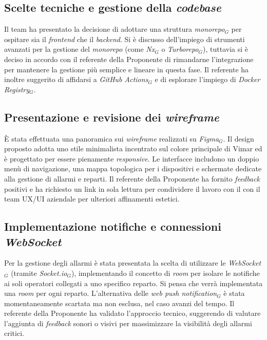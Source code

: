 \documentclass[10pt, letterpaper]{article}
\begin{document}
\subsection*{Scelte tecniche e gestione della \textit{codebase}}
Il team ha presentato la decisione di adottare una struttura \textit{monorepo$_G$} per ospitare sia il
\textit{frontend} che il \textit{backend}. Si è discusso dell'impiego di strumenti avanzati per la gestione
del \textit{monorepo} (come \textit{Nx$_G$} o \textit{Turborepo$_G$}), tuttavia si è deciso in accordo con il
referente della Proponente di rimandarne l'integrazione per mantenere la gestione più semplice e lineare in questa fase.
Il referente ha inoltre suggerito di affidarsi a \textit{GitHub Actions$_G$} e di esplorare l'impiego di \textit{Docker Registry$_G$}.

\subsection*{Presentazione e revisione dei \textit{wireframe}}
È stata effettuata una panoramica sui \textit{wireframe} realizzati su \textit{Figma$_G$}. Il design
proposto adotta uno stile minimalista incentrato sul colore principale di Vimar ed è progettato per essere pienamente
\textit{responsive}. Le interfacce includono un doppio menù di navigazione, una mappa topologica per i dispositivi
e schermate dedicate alla gestione di allarmi e reparti. Il referente della Proponente ha fornito \textit{feedback}
positivi e ha richiesto un link in sola lettura per condividere il lavoro con il con il team UX/UI aziendale
per ulteriori affinamenti estetici.

\subsection*{Implementazione notifiche e connessioni \textit{WebSocket}}
Per la gestione degli allarmi è stata presentata la scelta di utilizzare le \textit{WebSocket$_G$}
(tramite \textit{Socket.io$_G$}), implementando il concetto di \textit{room} per isolare le notifiche ai soli operatori
collegati a uno specifico reparto. Si pensa che verrà implementata una \textit{room} per ogni reparto.
L'alternativa delle \textit{web push notification$_G$} è stata momentaneamente scartata ma non esclusa, nel caso avanzi del tempo.
Il referente della Proponente ha validato l'approccio tecnico, suggerendo di valutare l'aggiunta di \textit{feedback}
sonori o visivi per massimizzare la visibilità degli allarmi critici.
\end{document}
